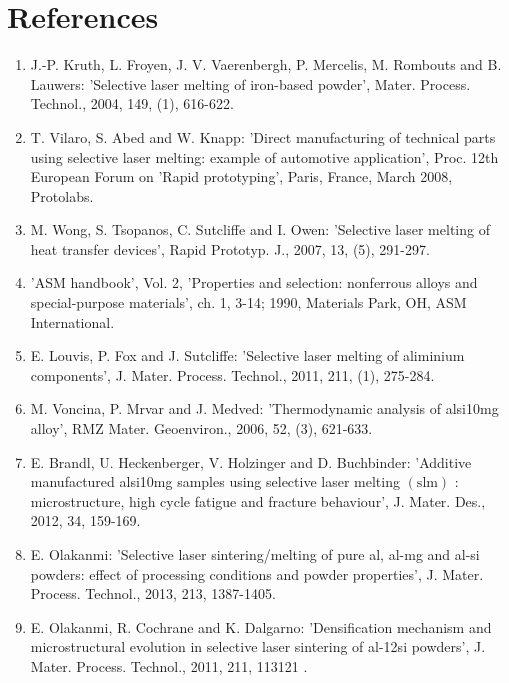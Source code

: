 \documentclass[10pt]{article}
\begin{document}
\section*{References}
\begin{enumerate}
  \item J.-P. Kruth, L. Froyen, J. V. Vaerenbergh, P. Mercelis, M. Rombouts and B. Lauwers: 'Selective laser melting of iron-based powder', Mater. Process. Technol., 2004, 149, (1), 616-622.

  \item T. Vilaro, S. Abed and W. Knapp: 'Direct manufacturing of technical parts using selective laser melting: example of automotive application', Proc. 12th European Forum on 'Rapid prototyping', Paris, France, March 2008, Protolabs.

  \item M. Wong, S. Tsopanos, C. Sutcliffe and I. Owen: 'Selective laser melting of heat transfer devices', Rapid Prototyp. J., 2007, 13, (5), 291-297.

  \item 'ASM handbook', Vol. 2, 'Properties and selection: nonferrous alloys and special-purpose materials', ch. 1, 3-14; 1990, Materials Park, OH, ASM International.

  \item E. Louvis, P. Fox and J. Sutcliffe: 'Selective laser melting of aliminium components', J. Mater. Process. Technol., 2011, 211, (1), 275-284.

  \item M. Voncina, P. Mrvar and J. Medved: 'Thermodynamic analysis of alsi10mg alloy', RMZ Mater. Geoenviron., 2006, 52, (3), 621-633.

  \item E. Brandl, U. Heckenberger, V. Holzinger and D. Buchbinder: 'Additive manufactured alsi10mg samples using selective laser melting $(\mathrm{slm})$ : microstructure, high cycle fatigue and fracture behaviour', J. Mater. Des., 2012, 34, 159-169.

  \item E. Olakanmi: 'Selective laser sintering/melting of pure al, al-mg and al-si powders: effect of processing conditions and powder properties', J. Mater. Process. Technol., 2013, 213, 1387-1405.

  \item E. Olakanmi, R. Cochrane and K. Dalgarno: 'Densification mechanism and microstructural evolution in selective laser sintering of al-12si powders', J. Mater. Process. Technol., 2011, 211, 113121 .


\end{enumerate}
\end{document}
